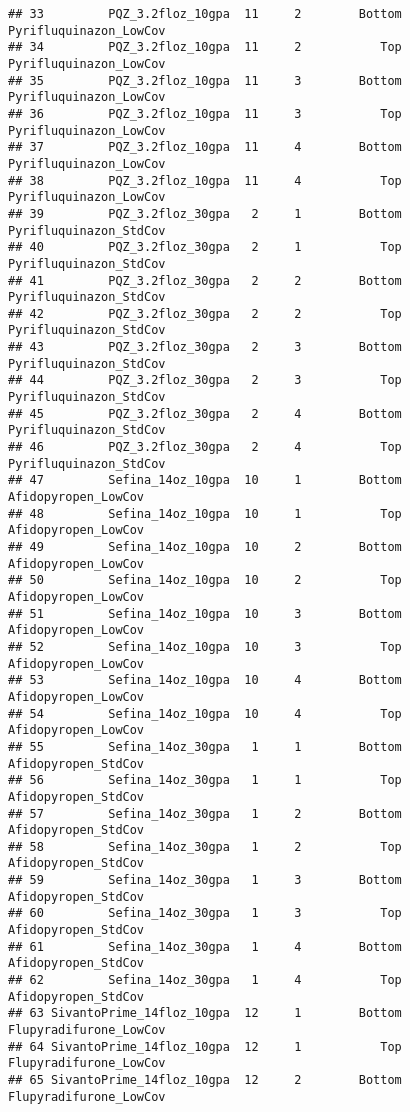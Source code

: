 \documentclass[
]{article}
\begin{document}
\begin{verbatim}
## 33         PQZ_3.2floz_10gpa  11     2        Bottom Pyrifluquinazon_LowCov
## 34         PQZ_3.2floz_10gpa  11     2           Top Pyrifluquinazon_LowCov
## 35         PQZ_3.2floz_10gpa  11     3        Bottom Pyrifluquinazon_LowCov
## 36         PQZ_3.2floz_10gpa  11     3           Top Pyrifluquinazon_LowCov
## 37         PQZ_3.2floz_10gpa  11     4        Bottom Pyrifluquinazon_LowCov
## 38         PQZ_3.2floz_10gpa  11     4           Top Pyrifluquinazon_LowCov
## 39         PQZ_3.2floz_30gpa   2     1        Bottom Pyrifluquinazon_StdCov
## 40         PQZ_3.2floz_30gpa   2     1           Top Pyrifluquinazon_StdCov
## 41         PQZ_3.2floz_30gpa   2     2        Bottom Pyrifluquinazon_StdCov
## 42         PQZ_3.2floz_30gpa   2     2           Top Pyrifluquinazon_StdCov
## 43         PQZ_3.2floz_30gpa   2     3        Bottom Pyrifluquinazon_StdCov
## 44         PQZ_3.2floz_30gpa   2     3           Top Pyrifluquinazon_StdCov
## 45         PQZ_3.2floz_30gpa   2     4        Bottom Pyrifluquinazon_StdCov
## 46         PQZ_3.2floz_30gpa   2     4           Top Pyrifluquinazon_StdCov
## 47         Sefina_14oz_10gpa  10     1        Bottom    Afidopyropen_LowCov
## 48         Sefina_14oz_10gpa  10     1           Top    Afidopyropen_LowCov
## 49         Sefina_14oz_10gpa  10     2        Bottom    Afidopyropen_LowCov
## 50         Sefina_14oz_10gpa  10     2           Top    Afidopyropen_LowCov
## 51         Sefina_14oz_10gpa  10     3        Bottom    Afidopyropen_LowCov
## 52         Sefina_14oz_10gpa  10     3           Top    Afidopyropen_LowCov
## 53         Sefina_14oz_10gpa  10     4        Bottom    Afidopyropen_LowCov
## 54         Sefina_14oz_10gpa  10     4           Top    Afidopyropen_LowCov
## 55         Sefina_14oz_30gpa   1     1        Bottom    Afidopyropen_StdCov
## 56         Sefina_14oz_30gpa   1     1           Top    Afidopyropen_StdCov
## 57         Sefina_14oz_30gpa   1     2        Bottom    Afidopyropen_StdCov
## 58         Sefina_14oz_30gpa   1     2           Top    Afidopyropen_StdCov
## 59         Sefina_14oz_30gpa   1     3        Bottom    Afidopyropen_StdCov
## 60         Sefina_14oz_30gpa   1     3           Top    Afidopyropen_StdCov
## 61         Sefina_14oz_30gpa   1     4        Bottom    Afidopyropen_StdCov
## 62         Sefina_14oz_30gpa   1     4           Top    Afidopyropen_StdCov
## 63 SivantoPrime_14floz_10gpa  12     1        Bottom Flupyradifurone_LowCov
## 64 SivantoPrime_14floz_10gpa  12     1           Top Flupyradifurone_LowCov
## 65 SivantoPrime_14floz_10gpa  12     2        Bottom Flupyradifurone_LowCov

\end{verbatim}
\end{document}
